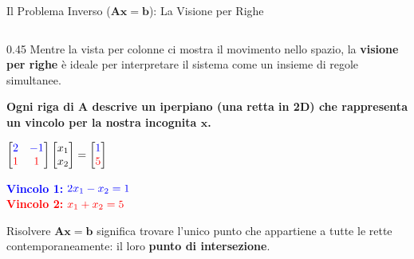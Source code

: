 \documentclass[aspectratio=169, 10pt]{beamer}
\begin{document}
\begin{frame}{Il Problema Inverso ($\mathbf{A}\mathbf{x} = \mathbf{b}$): La Visione per Righe}
    \begin{columns}[T,onlytextwidth]
        \setlength{\columnsep}{0.45cm}
        
        \begin{column}{0.45\textwidth}
            \vspace{0.2cm}
            \small
            Mentre la vista per colonne ci mostra il movimento nello spazio, la \textbf{visione per righe} è ideale per interpretare il sistema come un insieme di regole simultanee.
            
            \vspace{0.4cm}
            \textbf{Ogni riga di $\mathbf{A}$ descrive un iperpiano (una retta in 2D) che rappresenta un vincolo per la nostra incognita $\mathbf{x}$.}
            
            \vspace{0.4cm}
            \centering
            $ \begin{bmatrix} \color{blue}2 & \color{blue}-1 \\ \color{red}1 & \color{red}1 \end{bmatrix} 
            \begin{bmatrix} x_1 \\ x_2 \end{bmatrix} = 
            \begin{bmatrix} \color{blue}1 \\ \color{red}5 \end{bmatrix} $
            
            \vspace{0.4cm}
            \begin{flushleft}
                \footnotesize
                \textcolor{blue}{\textbf{Vincolo 1:}} $\color{blue}2x_1 - x_2 = 1$ \\
                \vspace{0.1cm}
                \textcolor{red}{\textbf{Vincolo 2:}} $\color{red}x_1 + x_2 = 5$
            \end{flushleft}
            
            \vspace{0.3cm}
            Risolvere $\mathbf{A}\mathbf{x} = \mathbf{b}$ significa trovare l'unico punto che appartiene a tutte le rette contemporaneamente: il loro \textbf{punto di intersezione}.
        \end{column}
        

\end{columns}
\end{frame}
\end{document}

